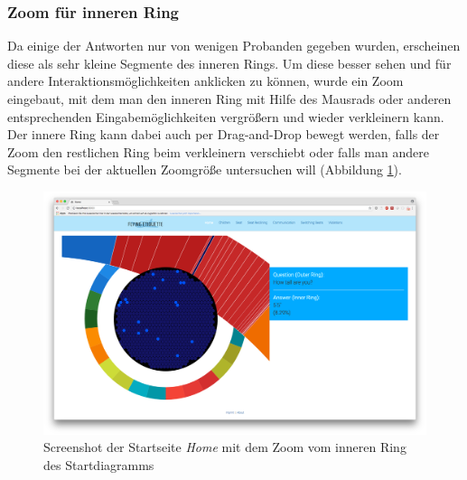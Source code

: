 \documentclass{mi-seminar}
\begin{document}
\subsubsection{Zoom für inneren Ring}
Da einige der Antworten nur von wenigen Probanden gegeben wurden, erscheinen diese als sehr kleine Segmente des inneren Rings. Um diese besser sehen und für andere Interaktionsmöglichkeiten anklicken zu können, wurde ein Zoom eingebaut, mit dem man den inneren Ring mit Hilfe des Mausrads oder anderen entsprechenden Eingabemöglichkeiten vergrößern und wieder verkleinern kann. Der innere Ring kann dabei auch per Drag-and-Drop bewegt werden, falls der Zoom den restlichen Ring beim verkleinern verschiebt oder falls man andere Segmente bei der aktuellen Zoomgröße untersuchen will (Abbildung \ref{ScStartDiagramZoom}).
\begin{figure}[h]
\includegraphics[scale=0.3]{assets/start_inner_ring_zoom.png}
\caption{Screenshot der Startseite \textit{Home} mit dem Zoom vom inneren Ring des Startdiagramms}
\label{ScStartDiagramZoom}
\end{figure}
\end{document}
